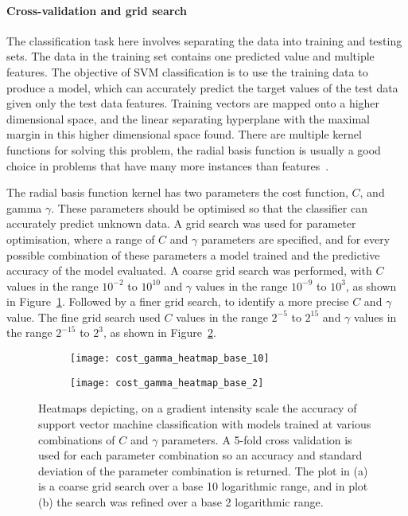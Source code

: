 \paragraph{Cross-validation and grid search}
The classification task here involves separating the data into training and testing sets. The data in the training set contains one predicted value and multiple features. The objective of SVM classification is to use the training data to produce a model, which can accurately predict the target values of the test data given only the test data features. Training vectors are mapped onto a higher dimensional space, and the linear separating hyperplane with the maximal margin in this higher dimensional space found. There are multiple kernel functions for solving this problem, the radial basis function is usually a good choice in problems that have many more instances than features~\cite{Hsu2008}.

The radial basis function kernel has two parameters the cost function, $C$, and gamma $\gamma$. These parameters should be optimised so that the classifier can accurately predict unknown data. A grid search was used for parameter optimisation, where a range of $C$ and $\gamma$ parameters are specified, and for every possible combination of these parameters a model trained and the predictive accuracy of the model evaluated. A coarse grid search was performed, with $C$ values in the range $10^{-2}$ to $10^{10}$ and $\gamma$ values in the range $10^{-9}$ to $10^{3}$, as shown in Figure~\ref{figure:cost_gamma_heatmap:base10}. Followed by a finer grid search, to identify a more precise $C$ and $\gamma$ value. The fine grid search used $C$ values in the range $2^{-5}$ to $2^{15}$ and $\gamma$ values in the range $2^{-15}$ to $2^{3}$, as shown in Figure~\ref{figure:cost_gamma_heatmap:base2}.
\begin{figure}[htbp]{}
	\centering
	\begin{subfigure}[b]{0.7\linewidth}
		\texttt{[image: cost\_gamma\_heatmap\_base\_10]}
		\caption{}
		\label{figure:cost_gamma_heatmap:base10}
	\end{subfigure}
	\begin{subfigure}[b]{0.7\linewidth}
		\texttt{[image: cost\_gamma\_heatmap\_base\_2]}
		\caption{}
		\label{figure:cost_gamma_heatmap:base2}
	\end{subfigure}
\caption[Radial basis function grid-search parameter optimisation]{Heatmaps depicting, on a gradient intensity scale the accuracy of support vector machine classification with models trained at various combinations of $C$ and $\gamma$ parameters. A 5-fold cross validation is used for each parameter combination so an accuracy and standard deviation of the parameter combination is returned. The plot in (a) is a coarse grid search over a base 10 logarithmic range, and in plot (b) the search was refined over a base 2 logarithmic range.}
\label{figure:cost_gamma_heatmap}
\end{figure}

